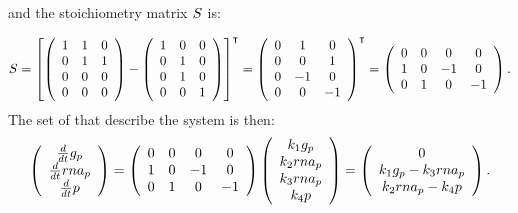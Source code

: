 and the stoichiometry matrix $S$ is:

\begin{gather*}
    \stoichmat = 
%
    \left[
        \left( \begin{array}{ccc}
                1 & 1 & 0 \\
                0 & 1 & 1 \\
                0 & 0 & 0 \\
                0 & 0 & 0
        \end{array} \right) -
        \left( \begin{array}{ccc}
                1 & 0 & 0 \\
                0 & 1 & 0 \\
                0 & 1 & 0 \\
                0 & 0 & 1   
        \end{array} \right)
    \right]^{\intercal} =
%
    \left( \begin{array}{ccc}
            0 & 1 & 0 \\
            0 & 0 & 1 \\
            0 & -1 & 0 \\
            0 & 0 & -1
    \end{array} \right)^{\intercal} =
%
    \left( \begin{array}{cccc}
         0 & 0 & 0 & 0 \\
         1 & 0 & -1 & 0 \\
         0 & 1 & 0 & -1
    \end{array} \right).
\end{gather*}
The set of  that describe the system is then:
\begin{gather*}\label{eq:simple_expression_ode}
    \left( \begin{array}{c}
        \ddt{}\con{g_p} \\
        \ddt{}\con{rna_p} \\
        \ddt{}\con{p}
    \end{array} \right) =
%
    \left( \begin{array}{cccc}
         0 & 0 & 0 & 0 \\
         1 & 0 & -1 & 0 \\
         0 & 1 & 0 & -1
    \end{array} \right)
    \left( \begin{array}{c}
        \condetx{1} \con{g_p} \\
        \condetx{2} \con{rna_p} \\
        \condetx{3} \con{rna_p} \\
        \condetx{4} \con{p}
    \end{array} \right) =
%
    \left( \begin{array}{c}
        0 \\
        \condetx{1} \con{g_p} - \condetx{3} \con{rna_p} \\
        \condetx{2} \con{rna_p} - \condetx{4} \con{p}
    \end{array} \right).
\end{gather*}
